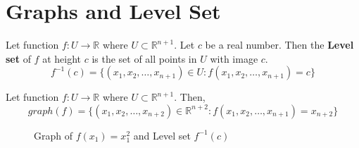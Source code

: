

\section{Graphs and Level Set}
\begin{definition}
	Let function $f : U \to \mathbb{R}$ where $U \subset \mathbb{R}^{n+1}$.
	Let $c$ be a real number.
	Then the \textbf{Level set} of $f$ at height $c$ is the set of all points in $U$ with image $c$.
	\begin{equation}
		f^{-1}(c) = \{ (x_1,x_2,\dots,x_{n+1}) \in U : f(x_1,x_2,\dots,x_{n+1}) = c \}
	\end{equation} 
\end{definition}

\begin{definition}
	Let function $f : U \to \mathbb{R}$ where $U \subset \mathbb{R}^{n+1}$.
	Then,
\begin{equation}
	graph(f) = \{ (x_1,x_2,\dots,x_{n+2}) \in \mathbb{R}^{n+2} : f(x_1,x_2,\dots,x_{n+1}) = x_{n+2} \}
\end{equation}
\end{definition}

\begin{figure}[h]
\centering
{}
\caption{Graph of $f(x_1)=x_1^2$ and Level set $f^{-1}(c)$}
\end{figure}

